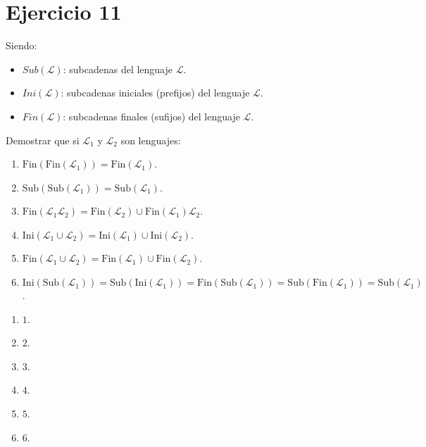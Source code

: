 \documentclass[12pt]{article}
\begin{document}
\section{Ejercicio 11}
Siendo: 
\begin{itemize}
    \item $Sub(\mathcal{L})$: subcadenas del lenguaje $\mathcal{L}$.
    \item $Ini(\mathcal{L})$: subcadenas iniciales (prefijos) del lenguaje $\mathcal{L}$.
    \item $Fin(\mathcal{L})$: subcadenas finales (sufijos) del lenguaje $\mathcal{L}$.
\end{itemize}
Demostrar que si $\mathcal{L}_1$ y $\mathcal{L}_2$ son lenguajes:
\begin{enumerate}[label = \Roman*.]
    \item $\text{Fin}(\text{Fin}(\mathcal{L}_1)) = \text{Fin}(\mathcal{L}_1)$.
    \item $\text{Sub}(\text{Sub}(\mathcal{L}_1)) = \text{Sub}(\mathcal{L}_1)$.
    \item $\text{Fin}(\mathcal{L}_1 \mathcal{L}_2) = \text{Fin}(\mathcal{L}_2) \cup \text{Fin}(\mathcal{L}_1) \mathcal{L}_2$.
    \item $\text{Ini}(\mathcal{L}_1 \cup \mathcal{L}_2) = \text{Ini}(\mathcal{L}_1) \cup \text{Ini}(\mathcal{L}_2)$.
    \item $\text{Fin}(\mathcal{L}_1 \cup \mathcal{L}_2) = \text{Fin}(\mathcal{L}_1) \cup \text{Fin}(\mathcal{L}_2)$.
    \item $\text{Ini}(\text{Sub}(\mathcal{L}_1)) = \text{Sub}(\text{Ini}(\mathcal{L}_1)) = \text{Fin}(\text{Sub}(\mathcal{L}_1)) = \text{Sub}(\text{Fin}(\mathcal{L}_1)) = \text{Sub}(\mathcal{L}_1)$.
\end{enumerate}
\begin{enumerate}[label=\roman*.,font=\itshape]
    \item $1$.
    \item $2$.
    \item $3$.
    \item $4$.
    \item $5$.
    \item $6$.
\end{enumerate}
\end{document}
